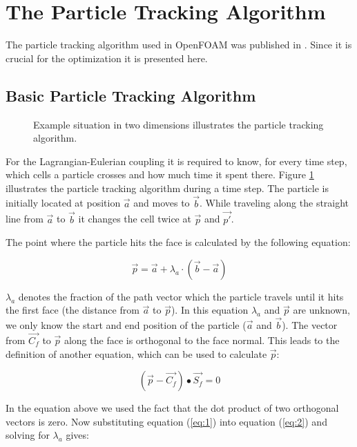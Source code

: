 \section{The Particle Tracking Algorithm}
\label{sec:particleTrackingAlgo}

The particle tracking algorithm used in OpenFOAM was published in \cite{macpherson08}. Since it is crucial for the optimization it is presented here.

\subsection{Basic Particle Tracking Algorithm}

\begin{figure}[H]
  \centering
  
  \caption{Example situation in two dimensions illustrates the particle tracking algorithm.}
  \label{fig:f2f}
\end{figure}

For the Lagrangian-Eulerian coupling it is required to know, for every time step, which cells a particle crosses and how much time it spent there. Figure \ref{fig:f2f} illustrates the particle tracking algorithm during a time step. The particle is initially located at position $\vec{a}$ and moves to $\vec{b}$. While traveling along the straight line from $\vec{a}$ to $\vec{b}$ it changes the cell twice at $\vec{p}$ and $\vec{p'}$.

The point where the particle hits the face is calculated by the following equation:

\begin{equation}
  \label{eq:1}
  \vec{p} = \vec{a} + \lambda_a \cdot (\vec{b}-\vec{a})
\end{equation}

$\lambda_a$ denotes the fraction of the path vector which the particle travels until it hits the first face (the distance from $\vec{a}$ to $\vec{p}$). In this equation $\lambda_a$ and $\vec{p}$ are unknown, we only know the start and end position of the particle ($\vec{a}$ and $\vec{b}$). The vector from $\vec{C_f}$ to $\vec{p}$ along the face is orthogonal to the face normal. This leads to the definition of another equation, which can be used to calculate $\vec{p}$:

\begin{equation}
 \label{eq:2}
 (\vec{p} - \vec{C_f}) \bullet \vec{S_f} = 0
\end{equation}

In the equation above we used the fact that the dot product of two orthogonal vectors is zero. Now substituting equation (\ref{eq:1}) into equation (\ref{eq:2}) and solving for $\lambda_a$ gives:


